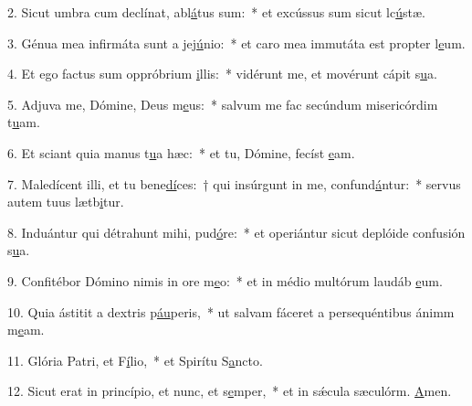 2. Sicut umbra cum declínat, abl\uline{á}tus sum:~* et excússus sum sicut lc\uline{ú}stæ.\par 
3. Génua mea infirmáta sunt a jej\uline{ú}nio:~* et caro mea immutáta est propter l\uline{e}um.\par 
4. Et ego factus sum oppróbrium \uline{i}llis:~* vidérunt me, et movérunt cápit s\uline{u}a.\par 
5. Adjuva me, Dómine, Deus m\uline{e}us:~* salvum me fac secúndum misericórdim t\uline{u}am.\par 
6. Et sciant quia manus t\uline{u}a hæc:~* et tu, Dómine, fecíst \uline{e}am.\par 
7. Maledícent illi, et tu bene\uline{dí}ces:~† qui insúrgunt in me, confund\uline{á}ntur:~* servus autem tuus lætb\uline{i}tur.\par 
8. Induántur qui détrahunt mihi, pud\uline{ó}re:~* et operiántur sicut deplóide confusión s\uline{u}a.\par 
9. Confitébor Dómino nimis in ore m\uline{e}o:~* et in médio multórum laudáb \uline{e}um.\par 
10. Quia ástitit a dextris p\uline{áu}peris,~* ut salvam fáceret a persequéntibus ánimm m\uline{e}am.\par 
11. Glória Patri, et F\uline{í}lio,~* et Spirítu S\uline{a}ncto.\par 
12. Sicut erat in princípio, et nunc, et s\uline{e}mper,~* et in sǽcula sæculórm. \uline{A}men.\par 
